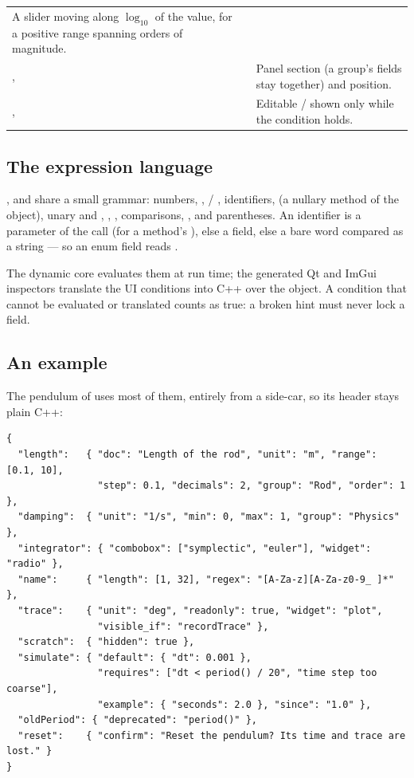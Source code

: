 \begin{center}
\begin{longtable}{@{}L{2.4cm}L{5.0cm}L{6.6cm}@{}}
  A slider moving along $\log_{10}$ of the value, for a positive range spanning
  orders of magnitude. \\
\addlinespace
{},  &  \newline
   &
  Panel section (a group's fields stay together) and position. \\
\addlinespace
{},  & 
  \newline {} &
  Editable / shown only while the condition holds. \\
\bottomrule
\end{longtable}
\end{center}

\subsection{The expression language}

,  and  share a small
grammar: numbers, ,  / , identifiers,
 (a nullary method of the object), unary \code{-} and \code{!},
\code{* /}, \code{+ -}, comparisons, \code{\&\&}, \code{||} and parentheses. An
identifier is a parameter of the call (for a method's ), else a
field, else a bare word compared as a string --- so an enum field reads
.

The dynamic core evaluates them at run time; the generated Qt and ImGui
inspectors translate the UI conditions into C++ over the object. A condition
that cannot be evaluated or translated counts as true: a broken hint must never
lock a field.

\subsection{An example}

The pendulum of  uses most of them, entirely from a
side-car, so its header stays plain C++:

\begin{lstlisting}[style=json]
{
  "length":   { "doc": "Length of the rod", "unit": "m", "range": [0.1, 10],
                "step": 0.1, "decimals": 2, "group": "Rod", "order": 1 },
  "damping":  { "unit": "1/s", "min": 0, "max": 1, "group": "Physics" },
  "integrator": { "combobox": ["symplectic", "euler"], "widget": "radio" },
  "name":     { "length": [1, 32], "regex": "[A-Za-z][A-Za-z0-9_ ]*" },
  "trace":    { "unit": "deg", "readonly": true, "widget": "plot",
                "visible_if": "recordTrace" },
  "scratch":  { "hidden": true },
  "simulate": { "default": { "dt": 0.001 },
                "requires": ["dt < period() / 20", "time step too coarse"],
                "example": { "seconds": 2.0 }, "since": "1.0" },
  "oldPeriod": { "deprecated": "period()" },
  "reset":    { "confirm": "Reset the pendulum? Its time and trace are lost." }
}
\end{lstlisting}

